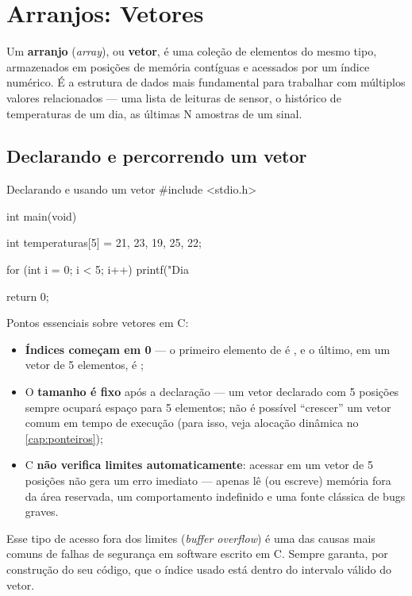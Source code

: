 \chapter{Arranjos: Vetores}
\label{cap:arranjos}

Um \textbf{arranjo} (\emph{array}), ou \textbf{vetor}, é uma coleção de elementos do mesmo tipo, armazenados em posições de memória contíguas e acessados por um índice numérico. É a estrutura de dados mais fundamental para trabalhar com múltiplos valores relacionados — uma lista de leituras de sensor, o histórico de temperaturas de um dia, as últimas N amostras de um sinal.

\section{Declarando e percorrendo um vetor}

\begin{codigoc}{Declarando e usando um vetor}
#include <stdio.h>

int main(void) {
    int temperaturas[5] = {21, 23, 19, 25, 22};

    for (int i = 0; i < 5; i++) {
        printf("Dia %
    }

    return 0;
}
\end{codigoc}

Pontos essenciais sobre vetores em C:

\begin{itemize}
    \item \textbf{Índices começam em 0} — o primeiro elemento de  é , e o último, em um vetor de 5 elementos, é ;
    \item O \textbf{tamanho é fixo} após a declaração — um vetor declarado com 5 posições sempre ocupará espaço para 5 elementos; não é possível ``crescer'' um vetor comum em tempo de execução (para isso, veja alocação dinâmica no \cref{cap:ponteiros});
    \item C \textbf{não verifica limites automaticamente}: acessar  em um vetor de 5 posições não gera um erro imediato — apenas lê (ou escreve) memória fora da área reservada, um comportamento indefinido e uma fonte clássica de bugs graves.
\end{itemize}

\begin{atencao}
Esse tipo de acesso fora dos limites (\emph{buffer overflow}) é uma das causas mais comuns de falhas de segurança em software escrito em C. Sempre garanta, por construção do seu código, que o índice usado está dentro do intervalo válido do vetor.
\end{atencao}

